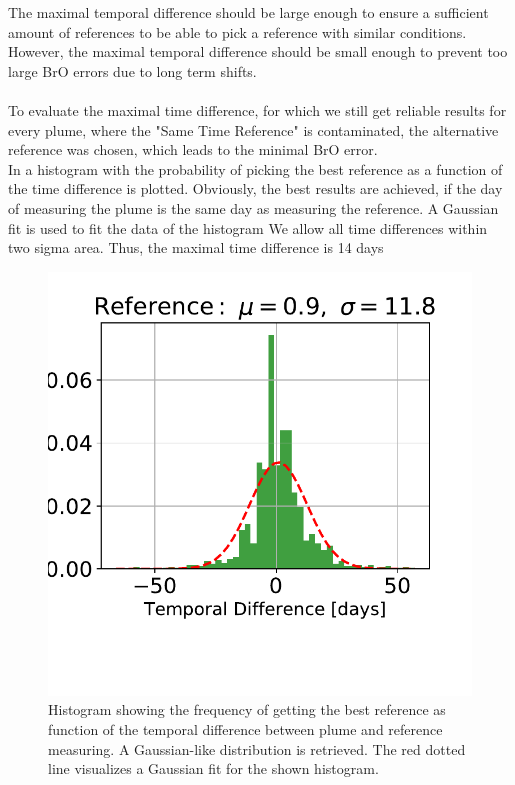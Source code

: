 The maximal temporal difference should be large enough to ensure a sufficient amount of references to be able to pick a reference with similar conditions. However, the maximal temporal difference should be small enough to prevent too large BrO errors due to long term shifts.\\
\\
To evaluate the maximal time difference, for which we still get reliable results for every plume, where the "Same Time Reference" is contaminated, the alternative reference was chosen, which leads to the minimal BrO error.\\
%
In  a histogram with the probability of picking the best reference as a function of the time difference is plotted. Obviously, the best results are achieved, if the day of measuring the plume is the same day as measuring the reference. A Gaussian fit is used to fit the data of the histogram We allow all time differences within two sigma area. Thus, the maximal time difference is 14 days\\
\begin{figure}
	\centering
	\includegraphics[width=0.7\linewidth]{Bilder/Hist}
	\caption{Histogram showing the frequency of getting the best reference as function of the temporal difference between plume and reference measuring. A Gaussian-like distribution is retrieved. The red dotted line visualizes a Gaussian fit for the shown histogram.}
	\label{fig:Hist}
\end{figure}
